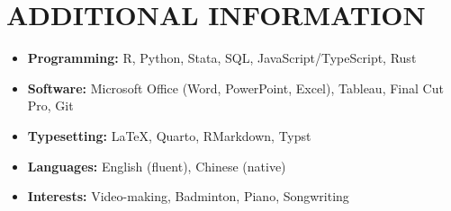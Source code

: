 \documentclass[a4paper,9pt]{extarticle}
\begin{document}
\section*{ADDITIONAL INFORMATION}
\begin{itemize}
    \item \textbf{Programming:} R, Python, Stata, SQL, JavaScript/TypeScript, Rust
    \item \textbf{Software:} Microsoft Office (Word, PowerPoint, Excel), Tableau, Final Cut Pro, Git
    \item \textbf{Typesetting:} \LaTeX, Quarto, RMarkdown, Typst
    \item \textbf{Languages:} English (fluent), Chinese (native)
    \item \textbf{Interests:} Video-making, Badminton, Piano, Songwriting
\end{itemize}

\end{document}

